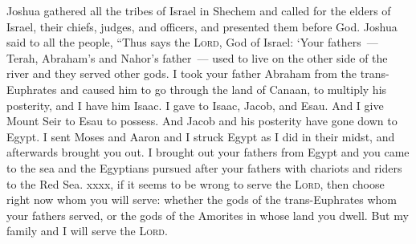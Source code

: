 
\begin{inparaenum}
     Joshua gathered all the tribes of Israel in Shechem and called for the elders of Israel, their chiefs, judges, and officers, and presented them before God.%
     Joshua said to all the people, ``Thus says the \textsc{Lord}, God of Israel: `Your fathers~--- Terah, Abraham's and Nahor's father~--- used to live on the other side of the river and they served other gods.%
     I took your father Abraham from the trans-Euphrates and caused him to go through the land of Canaan, to multiply his posterity, and I have him Isaac.%
     I gave to Isaac, Jacob, and Esau. And I give Mount Seir to Esau to possess. And Jacob and his posterity have gone down to Egypt.%
     I sent Moses and Aaron and I struck Egypt as I did in their midst, and afterwards brought you out.%
     I brought out your fathers from Egypt and you came to the sea and the Egyptians pursued after your fathers with chariots and riders to the Red Sea.%
     xxxx, if it seems to be wrong to serve the \textsc{Lord}, then choose right now whom you will serve: whether the gods of the trans-Euphrates whom your fathers served, or the gods of the Amorites in whose land you dwell. But my family and I will serve the \textsc{Lord}.%
    
    
    
    
\end{inparaenum}
